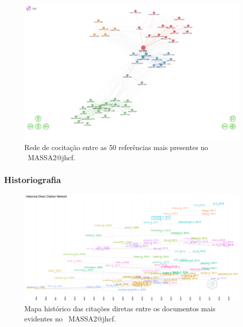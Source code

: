 \begin{figure}
    \centering
    \includegraphics[width=1\textwidth]{exploratory-data-analysis/jhcf/PesqBibliogr/SimulacaoMultiagente/WoS-20220203/Estrutura/Intelectual/MASSA2-CoCitation-Network-50-Papers.png}
    \caption{Rede de cocitação entre as 50 referências mais presentes no  \dataset\ MASSA2@jhcf.}
    \label{fig:MASSA2-CoCitation-Network}
\end{figure}

\subsubsection{Historiografia}

\begin{figure}
    \centering
    \includegraphics[width=1\textwidth]{exploratory-data-analysis/jhcf/PesqBibliogr/SimulacaoMultiagente/WoS-20220203/Estrutura/Intelectual/MASSA2-HistoricalDirectCitationNetwork-100docs.png}
    \caption{Mapa histórico das citações diretas entre os documentos mais evidentes no  \dataset\ MASSA2@jhcf.}
    \label{fig:MASSA2-HistoricalDirectCitationNetwork-100docs}
\end{figure}

